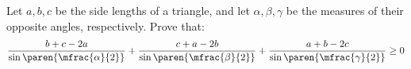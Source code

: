 Let $a, b, c$ be the side lengths of a triangle,
and let $\alpha, \beta, \gamma$ be the measures of their opposite angles, respectively.
Prove that:
\begin{equation*}
  \frac{b + c - 2a}{\sin\paren{\mfrac{\alpha}{2}}}
  + \frac{c + a - 2b}{\sin\paren{\mfrac{\beta}{2}}}
  + \frac{a + b - 2c}{\sin\paren{\mfrac{\gamma}{2}}}
  \geq 0
\end{equation*}
